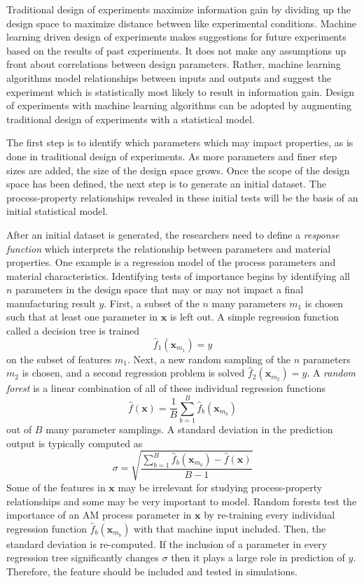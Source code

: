 Traditional design of experiments maximize information gain by dividing up the design space to maximize distance between like experimental conditions. Machine learning driven design of experiments makes suggestions for future experiments based on the results of past experiments. It does not make any assumptions up front about correlations between design parameters. Rather, machine learning algorithms model relationships between inputs and outputs and suggest the experiment which is statistically most likely to result in information gain. Design of experiments with machine learning algorithms can be adopted by augmenting traditional design of experiments with a statistical model.

The first step is to identify which parameters which may impact properties, as is done in traditional design of experiments. As more parameters and finer step sizes are added, the size of the design space grows. Once the scope of the design space has been defined, the next step is to generate an initial dataset. The process-property relationships revealed in these initial tests will be the basis of an initial statistical model. 

After an initial dataset is generated, the researchers need to define a \textit{response function} which interprets the relationship between parameters and material properties. One example is a regression model of the process parameters and material characteristics. Identifying tests of importance begins by identifying all $n$ parameters in the design space that may or may not impact a final manufacturing result $y$. First, a subset of the $n$ many parameters $m_1$ is chosen such that at least one parameter in $\mathbf{x}$ is left out. A simple regression function called a decision tree is trained
\begin{equation}
	\hat{f}_1(\mathbf{x}_{m_1}) = y
\end{equation}
on the subset of features $m_1$. Next, a new random sampling of the $n$ parameters $m_2$ is chosen, and a second regression problem is solved $\hat{f}_2(\mathbf{x}_{m_2}) = y$. A \textit{random forest} is a linear combination of all of these individual regression functions
\begin{equation}
	\hat{f}(\mathbf{x}) = \frac{1}{B} \sum_{b=1}^{B} \hat{f}_b(\mathbf{x}_{m_b})
	\label{randomforest}
\end{equation}
out of $B$ many parameter samplings. A standard deviation in the prediction output is typically computed as
\begin{equation}
	\sigma = \sqrt{\frac{\sum_{b=1}^B \hat{f}_b(\mathbf{x}_{m_b}) - \hat{f}(\mathbf{x})}{B-1}}
	\label{rfstddev}
\end{equation}
Some of the features in $\mathbf{x}$ may be irrelevant for studying process-property relationships and some may be very important to model. Random forests test the importance of an AM process parameter in $\mathbf{x}$ by re-training every individual regression function $\hat{f}_b(\mathbf{x}_{m_b})$ with that machine input included. Then, the standard deviation is re-computed. If the inclusion of a parameter in every regression tree significantly changes $\sigma$ then it plays a large role in prediction of $y$. Therefore, the feature should be included and tested in simulations.


